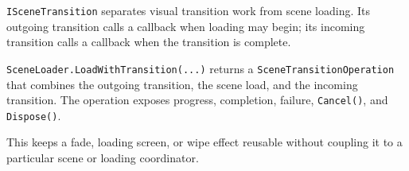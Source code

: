\texttt{ISceneTransition} separates visual transition work from scene loading. Its outgoing transition calls a callback when loading may begin; its incoming transition calls a callback when the transition is complete.

\texttt{SceneLoader.LoadWithTransition(...)} returns a \texttt{SceneTransitionOperation} that combines the outgoing transition, the scene load, and the incoming transition. The operation exposes progress, completion, failure, \texttt{Cancel()}, and \texttt{Dispose()}.

This keeps a fade, loading screen, or wipe effect reusable without coupling it to a particular scene or loading coordinator.
